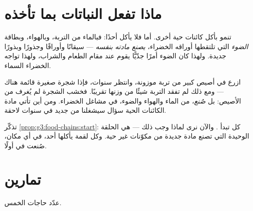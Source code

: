 \section{ماذا تفعل النباتات بما تأخذه}

\begin{proposition}\label{prop:g4:what-plants-need:make}
 تنمو بأكل كائنات حية أخرى. أما  فلا يأكل أحدًا:
فبالماء  من التربة، وبالهواء، وبطاقة \emph{الضوء}
التي تلتقطها أوراقه الخضراء، \emph{يصنع مادته بنفسه} --- سيقانًا
وأوراقًا وجذورًا وبذورًا جديدة. ولهذا كان الضوء أمرًا جدّيًّا يقوم عند
 مقام الطعام والشراب، ولهذا تواجه  الخضراء السماء.
\end{proposition}
\admitted

\begin{example}\label{ex:g4:what-plants-need:tree}
ازرع  في أصيص كبير من تربة موزونة، وانتظر سنوات، فإذا شجرة
صغيرة قائمة هناك --- ومع ذلك لم تفقد التربة شيئًا من وزنها
تقريبًا. فخشب الشجرة لم يُغرف من الأصيص: بل \emph{صُنع}، من الماء
والهواء والضوء، في مشاغل  الخضراء. ومن أين تأتي مادة
الكائنات الحية سؤال سيشغلنا من جديد في سنوات لاحقة.
\end{example}

\begin{remark}\label{rem:g4:what-plants-need:everyone}
تذكّر \cref{prop:g3:food-chains:start}: كل  تبدأ
. والآن نرى لماذا وجب ذلك ---  هي الحلقة الوحيدة
التي تصنع مادة جديدة من مكوّنات غير حية. وكل لقمة يأكلها أحد، في
أي مكان، صُنعت في  أولًا.
\end{remark}

\section{تمارين}

\begin{exercise}[$\star$]\label{exo:g4:what-plants-need:1}
عدّد حاجات  الخمس.
\end{exercise}

